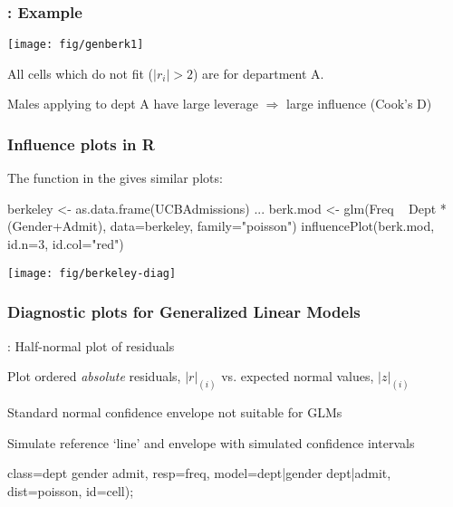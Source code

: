 \begin{frame}
\frametitle{: Example}
\begin{center}
  \texttt{[image: fig/genberk1]}
\end{center}
\begin{itemize*}

\item All cells which do not fit ($|r_i| > 2$) are for department A.
\item Males applying to dept A 
have large leverage $\Rightarrow$  large influence (Cook's D)
\end{itemize*}
\end{frame}

\begin{frame}[fragile]
\frametitle{Influence plots in R}
The  function in the  gives similar plots:
\vspace{1.2ex}
\begin{Input}[label=\fbox{\texttt{berkeley-diag.R}},baselinestretch=0.8]
berkeley <- as.data.frame(UCBAdmissions)
 ...
berk.mod <- glm(Freq ~ Dept * (Gender+Admit), data=berkeley, 
                family="poisson")
influencePlot(berk.mod, id.n=3, id.col="red")
\end{Input}
\begin{center}
\texttt{[image: fig/berkeley-diag]}
\end{center}
\end{frame}

\begin{frame}[fragile]
\frametitle{Diagnostic plots for Generalized Linear Models}
: Half-normal plot of residuals \citep{Atkinson:81}
   \begin{itemize*}
   \item Plot ordered \emph{absolute} residuals, $| r |_{(i)}$ vs. expected normal values, $| z |_{(i)}$
   \item Standard normal confidence envelope not suitable for GLMs
   \item Simulate reference `line' and envelope with simulated confidence intervals 
   \end{itemize*}

\vspace{2ex}
\begin{Input}[label=\fbox{$\cdots$ \texttt{genberk1.sas}}]
   class=dept gender admit,
   resp=freq, 
   model=dept|gender dept|admit, 
   dist=poisson, id=cell);
\end{Input}
\end{frame}


